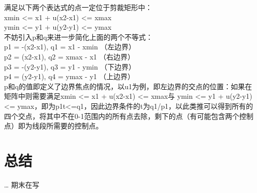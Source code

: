\documentclass[a4paper,UTF8]{article}
\theoremstyle{definition}
\begin{document}
\noindent{}满足以下两个表达式的点一定位于剪裁矩形中：\\
\indent{}xmin <= x1 + u(x2-x1) <= xmax\\
\indent{}ymin <= y1 + u(y2-y1) <= ymax\\
不妨引入p和q来进一步简化上面的两个不等式：\\
\indent{}p1 = -(x2-x1),  q1 = x1 - xmin （左边界）\\
\indent{}p2 =  (x2-x1),  q2 = xmax - x1 （右边界）\\
\indent{}p3 = -(y2-y1),  q3 = y1 - ymin （下边界）\\ 
\indent{}p4 =  (y2-y1),  q4 = ymax - y1 （上边界）\\ 
p和q的值即定义了边界焦点的情况，以u1为例，即左边界的交点的位置：如果在矩阵中则需要满足xmin <= x1 + u(x2-x1) <= xmax与
ymin <= y1 + u(y2-y1) <= ymax，即为p1t<=q1，因此边界条件的t为q1/p1，以此类推可以得到所有的四个交点，将其中不在0-1范围内的所有点去除，剩下的点（有可能包含两个控制点）即为线段所需要的控制点。

\section{总结}
\dots
期末在写

%

\end{document}
